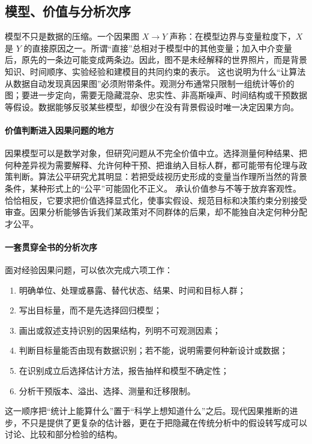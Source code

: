 \subsection{模型、价值与分析次序}

模型不只是数据的压缩。一个因果图 $X\rightarrow Y$ 声称：在模型边界与变量粒度下，$X$ 是 $Y$ 的直接原因之一。所谓“直接”总相对于模型中的其他变量；加入中介变量后，原先的一条边可能变成两条边。因此，图不是未经解释的世界照片，而是背景知识、时间顺序、实验经验和建模目的共同约束的表示。
这也说明为什么“让算法从数据自动发现真因果图”必须附带条件。观测分布通常只限制一组统计等价的图；要进一步定向，需要无隐藏混杂、忠实性、非高斯噪声、时间结构或干预数据等假设。数据能够反驳某些模型，却很少在没有背景假设时唯一决定因果方向。

\paragraph{价值判断进入因果问题的地方}

因果模型可以是数学对象，但研究问题从不完全价值中立。选择测量何种结果、把何种差异视为需要解释、允许何种干预、把谁纳入目标人群，都可能带有伦理与政策判断。算法公平研究尤其明显：若把受歧视历史形成的变量当作理所当然的背景条件，某种形式上的“公平”可能固化不正义。
承认价值参与不等于放弃客观性。恰恰相反，它要求把价值选择显式化，使事实假设、规范目标和决策约束分别接受审查。因果分析能够告诉我们某政策对不同群体的后果，却不能独自决定何种分配才公平。

\paragraph{一套贯穿全书的分析次序}

面对经验因果问题，可以依次完成六项工作：

\begin{enumerate}
  \item 明确单位、处理或暴露、替代状态、结果、时间和目标人群；
  \item 写出目标量，而不是先选择回归模型；
  \item 画出或叙述支持识别的因果结构，列明不可观测因素；
  \item 判断目标量能否由现有数据识别；若不能，说明需要何种新设计或数据；
  \item 在识别成立后选择估计方法，报告抽样和模型不确定性；
  \item 分析干预版本、溢出、选择、测量和迁移限制。
\end{enumerate}

这一顺序把“统计上能算什么”置于“科学上想知道什么”之后。现代因果推断的进步，不只是提供了更复杂的估计器，更在于把隐藏在传统分析中的假设转写成可以讨论、比较和部分检验的结构。


